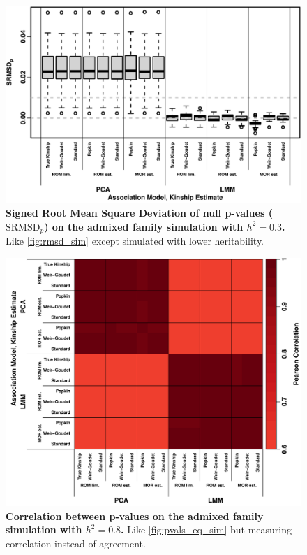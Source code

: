\documentclass[11pt]{article}
\newcommand{\rmsd}{\text{SRMSD}_p}
\begin{document}
\begin{figure}[hp!]
  \centering
  \includegraphics[width=\textwidth]{sim-admix-n1000-m100000-k3-f0.3-s0.5-g20/h-0.3/rmsd.pdf}
  \caption{
    {\bf Signed Root Mean Square Deviation of null p-values ($\rmsd$) on the admixed family simulation with $h^2=0.3$.}
    Like \cref{fig:rmsd_sim} except simulated with lower heritability.
    }
  \label{fig:rmsd_sim-h3}
\end{figure}

\begin{figure}[bp!]
  \centering
  \includegraphics[width=\textwidth]{sim-admix-n1000-m100000-k3-f0.3-s0.5-mc100-h0.8-g20-fes/pvals_cor.pdf}
  \caption{
    {\bf Correlation between p-values on the admixed family simulation with $h^2=0.8$.}
    Like \cref{fig:pvals_eq_sim} but measuring correlation instead of agreement.
    }
  \label{fig:pvals_cor_sim}
\end{figure}
\end{document}
